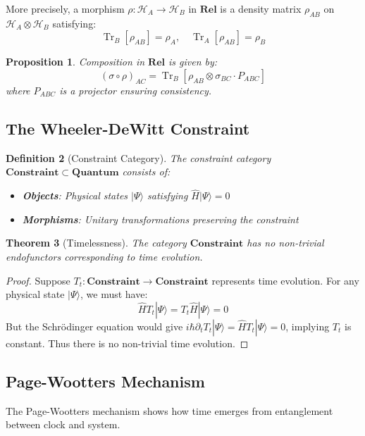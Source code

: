 \documentclass[12pt,a4paper]{article}
\newtheorem{theorem}{Theorem}[section]
\newtheorem{proposition}[theorem]{Proposition}
\newtheorem{definition}[theorem]{Definition}
\newcommand{\comp}{\circ}
\DeclareMathOperator{\Tr}{Tr}
\begin{document}
More precisely, a morphism $\rho: \mathcal{H}_A \to \mathcal{H}_B$ in $\mathbf{Rel}$ is a density matrix $\rho_{AB}$ on $\mathcal{H}_A \otimes \mathcal{H}_B$ satisfying:
\[
\Tr_B[\rho_{AB}] = \rho_A, \quad \Tr_A[\rho_{AB}] = \rho_B
\]

\begin{proposition}
Composition in $\mathbf{Rel}$ is given by:
\[
(\sigma \comp \rho)_{AC} = \Tr_B[\rho_{AB} \otimes \sigma_{BC} \cdot P_{ABC}]
\]
where $P_{ABC}$ is a projector ensuring consistency.
\end{proposition}

\subsection{The Wheeler-DeWitt Constraint}

\begin{definition}[Constraint Category]
The constraint category $\mathbf{Constraint} \subset \mathbf{Quantum}$ consists of:
\begin{itemize}
\item \textbf{Objects}: Physical states $|\Psi\rangle$ satisfying $\hat{H}|\Psi\rangle = 0$
\item \textbf{Morphisms}: Unitary transformations preserving the constraint
\end{itemize}
\end{definition}

\begin{theorem}[Timelessness]
The category $\mathbf{Constraint}$ has no non-trivial endofunctors corresponding to time evolution.
\end{theorem}

\begin{proof}
Suppose $T_t: \mathbf{Constraint} \to \mathbf{Constraint}$ represents time evolution. For any physical state $|\Psi\rangle$, we must have:
\[
\hat{H}T_t|\Psi\rangle = T_t\hat{H}|\Psi\rangle = 0
\]
But the Schrödinger equation would give $i\hbar\partial_t T_t|\Psi\rangle = \hat{H}T_t|\Psi\rangle = 0$, implying $T_t$ is constant. Thus there is no non-trivial time evolution.
\end{proof}

\subsection{Page-Wootters Mechanism}

The Page-Wootters mechanism shows how time emerges from entanglement between clock and system.
\end{document}
